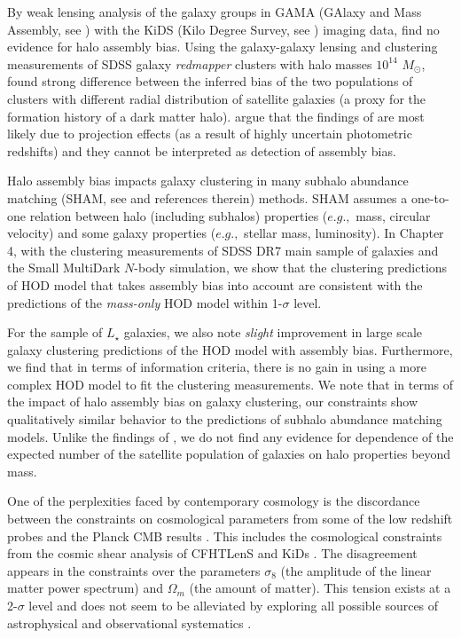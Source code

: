 By weak lensing analysis of the galaxy groups in GAMA (GAlaxy and Mass Assembly, see \citealt{driver}) 
with the KiDS (Kilo Degree Survey, see \citealt{kuijken2015}) imaging data, \citet{dvornik2017} find no evidence for halo assembly bias.
Using the galaxy-galaxy lensing and clustering measurements of SDSS galaxy \emph{redmapper} clusters \citep{rykoff} with halo masses $10^{14}$ $M_{\odot}$, 
\citet{miyatake2016} found strong difference between the inferred bias of the two populations of clusters with different radial distribution of satellite galaxies 
(a proxy for the formation history of a dark matter halo). \citet{zuetal2016} argue that the findings of \citet{miyatake2016} are most likely due to projection effects (as a result of highly uncertain photometric redshifts) and they cannot be interpreted as detection of assembly bias. 

Halo assembly bias impacts galaxy clustering in many subhalo abundance matching (SHAM, see \citealt{hearin2014,lehman2015} and references therein) methods. SHAM assumes a one-to-one relation between halo (including subhalos) properties ($e.g.,$ mass, circular velocity) and some galaxy properties ($e.g.,$ stellar mass, luminosity). In Chapter 4, with the clustering measurements of SDSS DR7 main sample of galaxies \citep{abazajian2009} and the Small MultiDark $N$-body simulation, we show that the clustering predictions of \citet{decorated} HOD model that takes assembly bias into account are consistent with the predictions of the \emph{mass-only} HOD model within 1-$\sigma$ level. 

For the sample of $L_{\star}$ galaxies, we also note \emph{slight} improvement in large scale galaxy clustering predictions of the HOD model with assembly bias. 
Furthermore, we find that in terms of information criteria, there is no gain in using a more complex HOD model to fit the clustering measurements.
We note that in terms of the impact of halo assembly bias on galaxy clustering, our constraints show qualitatively similar behavior to the predictions of subhalo abundance matching models. Unlike the findings of \citet{zentner2016}, we do not find any evidence for dependence of the expected number of the satellite population of galaxies on halo properties beyond mass.

One of the perplexities faced by contemporary cosmology is the discordance between the constraints on cosmological parameters from some of the low redshift probes and 
the Planck CMB results \citep{planckII}. This includes the cosmological constraints from the cosmic shear analysis of CFHTLenS \citep{heymans,kitching2016} and KiDs \citep{hildebrandt2017}. The disagreement appears in the constraints over the parameters $\sigma_{8}$ (the amplitude of the linear matter power spectrum) and $\Omega_{m}$ (the amount of matter). This tension exists at a 2-$\sigma$ level and does not seem to be alleviated by exploring all possible sources of astrophysical and observational systematics \citep{battye2014,boris2014,maccrann2015,grandis2016,raveri2016}. 

